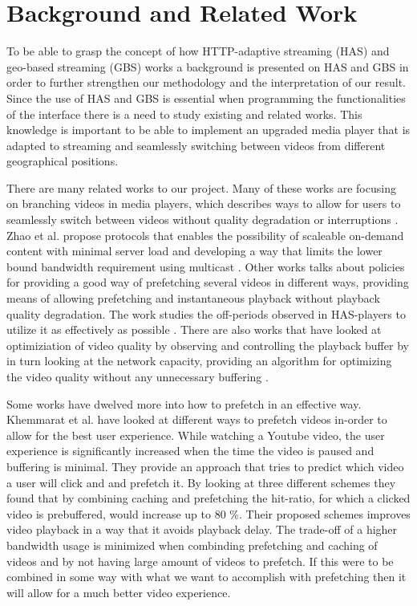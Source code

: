 \chapter{Background and Related Work}
\label{cha:theory}

To be able to grasp the concept of how HTTP-adaptive streaming (HAS) and geo-based streaming (GBS) works a background is presented on HAS and GBS in order to further strengthen our methodology and the interpretation of our result. Since the use of HAS and GBS is essential when programming the functionalities of the interface there is a need to study existing and related works. This knowledge is important to be able to implement an upgraded media player that is adapted to streaming and seamlessly switching between videos from different geographical positions.

There are many related works to our project. Many of these works are focusing on branching videos in media players, which describes ways to allow for users to seamlessly switch between videos without quality degradation or interruptions \cite{qualbranch, hasmultipath,scalableOnDemand}. Zhao et al. \cite{scalableOnDemand} propose protocols that enables the possibility of scaleable on-demand content with minimal server load and developing a way that limits the lower bound bandwidth requirement using multicast \cite{scalableOnDemand}. Other works talks about policies for providing a good way of prefetching several videos in different ways, providing means of allowing prefetching and instantaneous playback without playback quality degradation. The work studies the off-periods observed in HAS-players to utilize it as effectively as possible \cite{bandawarePrefetch}. There are also works that have looked at optimiziation of video quality by observing and controlling the playback buffer by in turn looking at the network capacity, providing an algorithm for optimizing the video quality without any unnecessary buffering \cite{bufferbased}.

Some works have dwelved more into how to prefetch in an effective way. Khemmarat et al. \cite{watchingprefetching} have looked at different ways to prefetch videos in-order to allow for the best user experience. While watching a Youtube video, the user experience is significantly increased when the time the video is paused and buffering is minimal. They provide an approach that tries to predict which video a user will click and and prefetch it. By looking at three different schemes they found that by combining caching and prefetching the hit-ratio, for which a clicked video is prebuffered, would increase up to 80 \%. Their proposed schemes improves video playback in a way that it avoids playback delay. The trade-off of a higher bandwidth usage is minimized when combinding prefetching and caching of videos and by not having large amount of videos to prefetch. If this were to be combined in some way with what we want to accomplish with prefetching then it will allow for a much better video experience.

